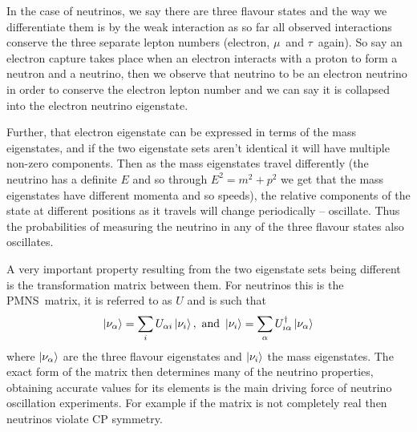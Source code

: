 \documentclass[a4paper,12pt]{article}
\newcommand{\Mu}{$\mu$}
\newcommand{\Tau}{$\tau$}
\begin{document}
In the case of neutrinos, we say there are three flavour states and the way we differentiate them is by the weak interaction as so far all observed interactions conserve the three separate lepton numbers (electron, \Mu\ and \Tau\ again).
So say an electron capture takes place when an electron interacts with a proton to form a neutron and a neutrino, then we observe that neutrino to be an electron neutrino in order to conserve the electron lepton number and we can say it is collapsed into the electron neutrino eigenstate.

Further, that electron eigenstate can be expressed in terms of the mass eigenstates, and if the two eigenstate sets aren't identical it will have multiple non-zero components.
Then as the mass eigenstates travel differently (the neutrino has a definite $E$ and so through $E^2 = m^2 + p^2$ we get that the mass eigenstates have different momenta and so speeds), the relative components of the state at different positions as it travels will change periodically -- oscillate.
Thus the probabilities of measuring the neutrino in any of the three flavour states also oscillates.

A very important property resulting from the two eigenstate sets being different is the transformation matrix between them.
For neutrinos this is the PMNS\footnotemark\ matrix, it is referred to as $U$ and is such that 
\begin{equation}
    \ket{\nu_\alpha} = \sum_i U_{\alpha i} \ket{\nu_i}, \text{ and }
    \ket{\nu_i} = \sum_\alpha U^\dag_{i \alpha} \ket{\nu_\alpha}
\end{equation}
where $\ket{\nu_\alpha}$ are the three flavour eigenstates and $\ket{\nu_i}$ the mass eigenstates.
The exact form of the matrix then determines many of the neutrino properties, obtaining accurate values for its elements is the main driving force of neutrino oscillation experiments.
For example if the matrix is not completely real then neutrinos violate CP symmetry\cite{zuberNeutrinoPhysics2020}.
\end{document}

